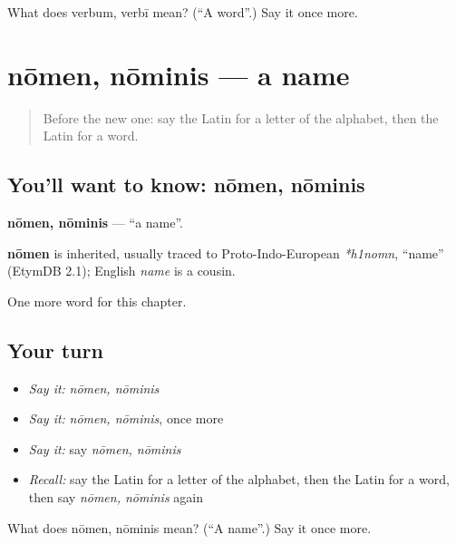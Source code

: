 \begin{tcolorbox}[breakable,colback=teal!4,colframe=teal!35!black,title={Before you move on}]
What does verbum, verbī mean? (\textquotedblleft{}A word\textquotedblright{}.) Say it once more.
\end{tcolorbox}
\section[nōmen, nōminis]{nōmen, nōminis — a name}

\label{lesson:LA-C278-nomen}



\begin{quote}
Before the new one: say the Latin for a letter of the alphabet, then the Latin for a word.
\end{quote}

\subsection*{You'll want to know: nōmen, nōminis}
\textbf{nōmen, nōminis} — \textquotedblleft{}a name\textquotedblright{}.

\begin{cousinweb}
\textbf{nōmen} is inherited, usually traced to Proto-Indo-European \emph{*h1nomn}, \textquotedblleft{}name\textquotedblright{} (EtymDB 2.1); English \emph{name} is a cousin.
\end{cousinweb}

\begin{grammarlens}[title={What you've built}]
One more word for this chapter.
\end{grammarlens}

\subsection*{Your turn}
\begin{itemize}
\raggedright
  \item \emph{Say it:} \emph{nōmen, nōminis}
  \item \emph{Say it:} \emph{nōmen, nōminis}, once more
  \item \emph{Say it:} say \emph{nōmen, nōminis}
  \item \emph{Recall:} say the Latin for a letter of the alphabet, then the Latin for a word, then say \emph{nōmen, nōminis} again
\end{itemize}

\begin{tcolorbox}[breakable,colback=teal!4,colframe=teal!35!black,title={Before you move on}]
What does nōmen, nōminis mean? (\textquotedblleft{}A name\textquotedblright{}.) Say it once more.
\end{tcolorbox}
